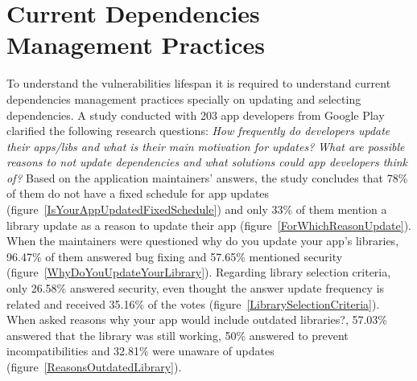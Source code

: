 \documentclass[pdf,bookmarks,colorlinks=true]{IEEEtran}
\begin{document}

\section{Current Dependencies Management Practices}
\label{sec:DependenciesManagement}


To understand the vulnerabilities lifespan it is required to understand current dependencies management practices specially on updating and selecting dependencies. A study \cite{Derr2017} conducted with 203 app developers from Google Play clarified the following research questions: {\em How frequently do developers update their apps/libs and what is their main motivation for updates?}
{\em What are possible reasons to not update dependencies and what solutions could app developers think of?}
Based on the application maintainers' answers, the study concludes that 78\% of them do not have a fixed schedule for app updates (figure~\ref{IsYourAppUpdatedFixedSchedule}) and only 33\% of them mention a library update as a reason to update their app (figure~\ref{ForWhichReasonUpdate}). When the maintainers were questioned why do you update your app's libraries, 96.47\% of them answered bug fixing and 57.65\% mentioned security (figure~\ref{WhyDoYouUpdateYourLibrary}). Regarding library selection criteria, only 26.58\% answered security, even thought the answer update frequency is related and received 35.16\% of the votes (figure~\ref{LibrarySelectionCriteria}). When asked reasons why your app would include outdated libraries?, 57.03\% answered that the library was still working, 50\% answered to prevent incompatibilities and 32.81\% were unaware of updates (figure~\ref{ReasonsOutdatedLibrary}).
\end{document}
